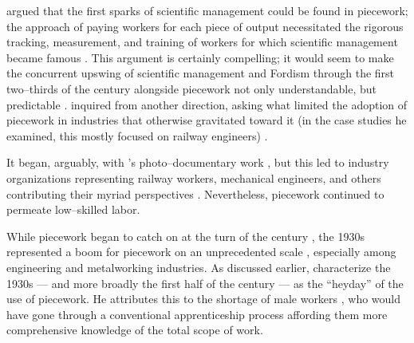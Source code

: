 \documentclass[trackingWork]{subfiles}
\begin{document}
\citeauthor{10.2307/23702539} argued that the first sparks of scientific management
could be found in piecework;
the approach of paying workers for each piece of output necessitated
the rigorous tracking, measurement, and training of workers
for which scientific management became famous
\cite{10.2307/23702539}.
This argument is certainly compelling;
it would seem to make the concurrent upswing of
scientific management and Fordism
through the first two--thirds of the  century
alongside piecework not only understandable, but predictable
\cite{hart2013rise}.
\citeauthor{Brown01041990} inquired from another direction, asking
what limited the adoption of piecework in industries that otherwise gravitated toward it
(in the case studies he examined, this mostly focused on railway engineers)
\cite{Brown01041990}. 


It began, arguably, with \citeauthor{riisOtherSideLives}'s photo--documentary work%
, but this led to industry organizations representing
railway workers, mechanical engineers, and others contributing their myriad perspectives
\cite{american1921problem,richards1904anything,riisOtherSideLives}.
Nevertheless, piecework continued to permeate low--skilled labor.

While piecework began to catch on at the turn of the  century%
, the 1930s represented a boom for piecework on an unprecedented scale%
, especially among engineering and metalworking industries.
As discussed earlier, \citeauthor{hart2013rise} characterize the 1930s
--- and more broadly the first half of the  century ---
as the ``heyday'' of the use of piecework.
He attributes this to the shortage of male workers%
, who would have gone through a conventional apprenticeship process
affording them more comprehensive knowledge of the total scope of work.

\end{document}
